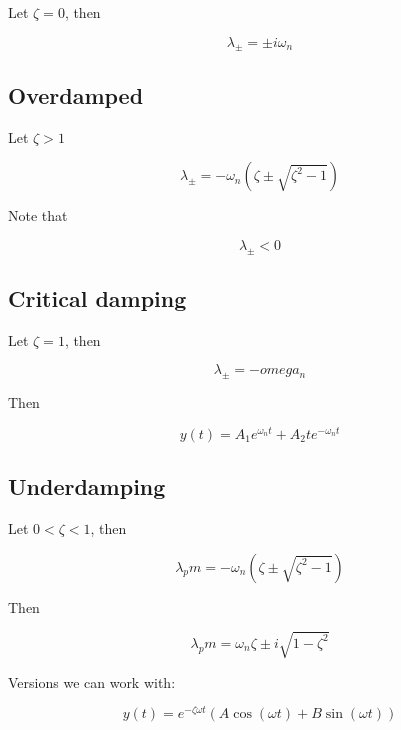 \documentclass{article}
\newtheorem{one minute paper}[theorem]{One Minute Paper}
\begin{document}
Let $\zeta = 0$, then 

\begin{equation}
    \lambda_\pm = \pm i\omega_n
\end{equation}

\subsection*{Overdamped}

Let $\zeta > 1$

\begin{equation}
    \lambda_\pm = -\omega_n(\zeta \pm \sqrt{\zeta^2 - 1})
\end{equation}

Note that

\begin{equation}
    \lambda_\pm < 0
\end{equation}

\subsection*{Critical damping}

Let $\zeta = 1$, then 

\begin{equation}
    \lambda_\pm = -omega_n
\end{equation}

Then 

\begin{equation}
    y(t) = A_1e^{\omega_nt} + A_2te^{-\omega_nt}
\end{equation}

\subsection*{Underdamping}

Let $0 < \zeta < 1$, then 

\begin{equation}
    \lambda_pm = -\omega_n(\zeta \pm \sqrt{\zeta^2 - 1})
\end{equation}

Then 

\begin{equation}
    \lambda_pm = \omega_n\zeta \pm i\sqrt{1 - \zeta^2}
\end{equation}

Versions we can work with:

\begin{equation}
    y(t) = e^{-\zeta\omega t}(A\cos(\omega t) + B\sin(\omega t))
\end{equation}
\end{document}
